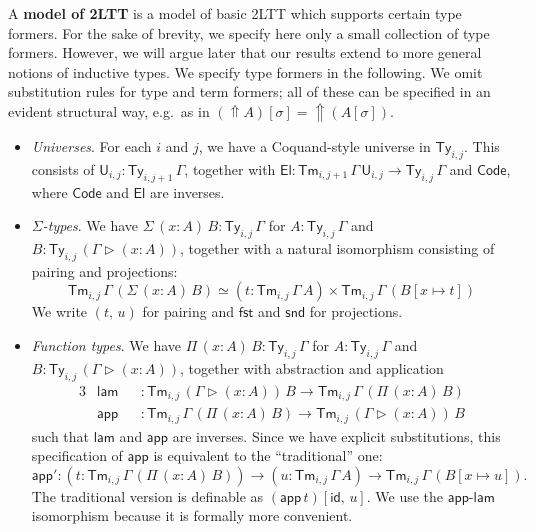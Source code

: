 \documentclass[acmsmall,screen]{acmart}
\newcommand{\msf}[1]{\mathsf{#1}}
\newcommand{\ext}{\triangleright}
\newcommand{\Code}{\msf{Code}}
\newcommand{\El}{\msf{El}}
\newcommand{\lam}{\msf{lam}}
\newcommand{\app}{\msf{app}}
\newcommand{\Lift}{{\Uparrow}}
\newcommand{\U}{\msf{U}}
\newcommand{\Ty}{\msf{Ty}}
\newcommand{\Tm}{\msf{Tm}}
\newcommand{\fst}{\msf{fst}}
\newcommand{\snd}{\msf{snd}}
\newcommand{\id}{\msf{id}}
\theoremstyle{remark}
\begin{document}
\begin{definition}
A \textbf{model of 2LTT} is a model of basic 2LTT which supports certain type
formers. For the sake of brevity, we specify here only a small collection of
type formers. However, we will argue later that our results extend to more
general notions of inductive types. We specify type formers in the following. We
omit substitution rules for type and term formers; all of these can be specified in
an evident structural way, e.g.\ as in $(\Lift A)[\sigma] = \Lift(A[\sigma])$.
\begin{itemize}
\item \emph{Universes}. For each $i$ and $j$, we have a Coquand-style universe
  \cite{coquand2018canonicity} in $\Ty_{i,j}$. This consists of $\U_{i,j} : \Ty_{i,j+1}\,\Gamma$,
  together with $\El : \Tm_{i,j+1}\,\Gamma\,\U_{i,j} \to \Ty_{i,j}\,\Gamma$ and $\Code$, where $\Code$
  and $\El$ are inverses.
\item \emph{$\Sigma$-types}. We have $\Sigma\,(x : A)\,B : \Ty_{i,j}\,\Gamma$ for $A : \Ty_{i,j}\,\Gamma$
  and $B : \Ty_{i,j}\,(\Gamma \ext (x : A))$, together with a natural isomorphism consisting of pairing and projections:
  \[ \Tm_{i,j}\,\Gamma\,(\Sigma\,(x : A)\,B) \simeq (t : \Tm_{i,j}\,\Gamma\,A) \times \Tm_{i,j}\,\Gamma\,(B[x\mapsto t]) \]
  We write $(t,\,u)$ for pairing and $\fst$ and $\snd$ for projections.
\item \emph{Function types}.
  We have $\Pi\,(x : A)\,B : \Ty_{i,j}\,\Gamma$ for $A : \Ty_{i,j}\,\Gamma$ and
  $B : \Ty_{i,j}\,(\Gamma \ext (x : A))$, together with abstraction and application
  \begin{alignat*}{3}
    & \lam &&: \Tm_{i,j}\,(\Gamma \ext (x : A))\,B \to \Tm_{i,j}\,\Gamma\,(\Pi\,(x : A)\,B) \\
    & \app &&: \Tm_{i,j}\,\Gamma\,(\Pi\,(x : A)\,B) \to \Tm_{i,j}\,(\Gamma \ext (x : A))\,B
  \end{alignat*}
  such that $\lam$ and $\app$ are inverses. Since we have explicit
  substitutions, this specification of $\app$ is equivalent to the
  ``traditional'' one:
  \[ \app' : (t : \Tm_{i,j}\,\Gamma\,(\Pi\,(x :
  A)\,B))\to (u : \Tm_{i,j}\,\Gamma\,A) \to \Tm_{i,j}\,\Gamma\,(B[x \mapsto
    u]).\]
  The traditional version is definable as $(\app\,t)[\id,\,u]$. We use
  the $\app$-$\lam$ isomorphism because it is formally more convenient.


\end{itemize}
\end{definition}
\end{document}
